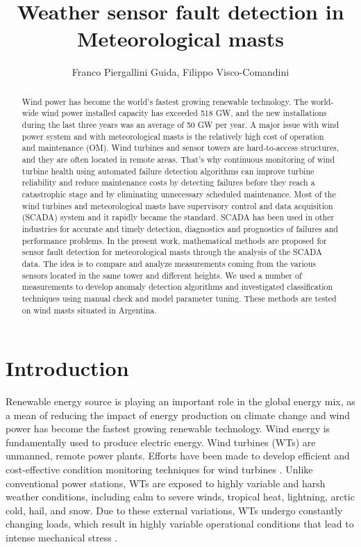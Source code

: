 \documentclass[journal]{IEEEtran}
\begin{document}
\title{Weather sensor fault detection in Meteorological masts}

\author{Franco Piergallini Guida, Filippo Visco-Comandini}
\maketitle

\begin{abstract}
Wind power has become the world's fastest growing renewable technology. The world-wide wind power installed capacity has exceeded 518 GW, and the new installations during the last three years was an average of 50 GW per year. A major issue with wind power system and with meteorological masts is the relatively high cost of operation and maintenance (OM). Wind turbines and sensor towers are hard-to-access structures, and they are often located in remote areas. That's why continuous monitoring of wind turbine health using automated failure detection algorithms can improve turbine reliability and reduce maintenance costs by detecting failures before they reach a catastrophic stage and by eliminating unnecessary scheduled maintenance.
Most of the wind turbines and meteorological masts have supervisory control and data acquisition (SCADA) system and it rapidly became the standard. SCADA has been used in other industries for accurate and timely detection, diagnostics and prognostics of failures and performance problems.
In the present work, mathematical methods are proposed for sensor fault detection for meteorological masts through the analysis of the SCADA data. The idea is to compare and analyze measurements coming from the various sensors located in the same tower and different heights. We used a number of measurements to develop anomaly detection algorithms and investigated classification techniques using manual check and model parameter tuning. 
These methods are tested on wind masts situated in Argentina.
\end{abstract}
\section{Introduction}
Renewable energy source is playing an important role in the global energy mix, as a mean of reducing the impact of energy production on climate change and wind power has become the fastest growing renewable technology. 
Wind energy is fundamentally used to produce electric energy. Wind turbines (WTs) are unmanned, remote power plants.  Efforts have been made to develop efficient and cost-effective condition monitoring techniques for wind turbines \cite{yang2014wind}. Unlike conventional power stations, WTs are exposed to highly variable and harsh weather conditions, including calm to severe winds, tropical heat, lightning, arctic cold, hail, and snow. Due to these external variations, WTs undergo constantly changing loads, which result in highly variable operational conditions that lead to intense mechanical stress \cite{ribrant2006thesis}. 
\end{document}
